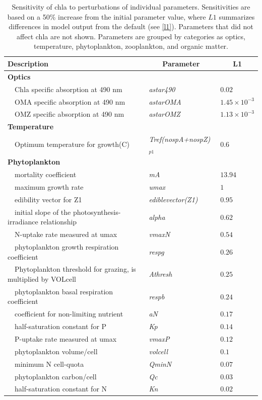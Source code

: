 \documentclass[letterpaper,12pt,oneside]{article}\usepackage[]{graphicx}\usepackage[]{color}
\begin{document}
\begin{table}[!tbp]
{\footnotesize
\caption{Sensitivity of \ac{chla} to perturbations of individual parameters.  Sensitivities are based on a 50\% increase from the initial parameter value, where $L1$ summarizes differences in model output from the default (see \cref{l1}).  Parameters that did not affect \ac{chla} are not shown.  Parameters are grouped by categories as optics, temperature, phytoplankton, zooplankton, and organic matter.\label{tab:chlsens}} 
\begin{center}
\begin{tabular}{lll}
\hline\hline
\multicolumn{1}{l}{Description}&\multicolumn{1}{c}{Parameter}&\multicolumn{1}{c}{L1}\tabularnewline
\hline
{\bfseries Optics}&&\tabularnewline
~~Chla specific absorption at 490 nm&\textit{astar490}&$0.02$\tabularnewline
~~OMA specific absorption at 490 nm&\textit{astarOMA}&$1.45\times 10^{-3}$\tabularnewline
~~OMZ specific absorption at 490 nm&\textit{astarOMZ}&$1.13\times 10^{-3}$\tabularnewline
\hline
{\bfseries Temperature}&&\tabularnewline
~~Optimum temperature for growth(C)&\textit{Tref(nospA+nospZ)$_{p1}$}&$0.6$\tabularnewline
\hline
{\bfseries Phytoplankton}&&\tabularnewline
~~mortality coefficient&\textit{mA}&$13.94$\tabularnewline
~~maximum growth rate&\textit{umax}&$1$\tabularnewline
~~edibility vector for Z1&\textit{ediblevector(Z1)}&$0.95$\tabularnewline
~~initial slope of the photosynthesis-irradiance relationship&\textit{alpha}&$0.62$\tabularnewline
~~N-uptake rate measured at umax&\textit{vmaxN}&$0.54$\tabularnewline
~~phytoplankton growth respiration coefficient&\textit{respg}&$0.26$\tabularnewline
~~Phytoplankton threshold for grazing, is multiplied by VOLcell&\textit{Athresh}&$0.25$\tabularnewline
~~phytoplankton basal respiration coefficient&\textit{respb}&$0.24$\tabularnewline
~~coefficient for non-limiting nutrient&\textit{aN}&$0.17$\tabularnewline
~~half-saturation constant for P&\textit{Kp}&$0.14$\tabularnewline
~~P-uptake rate measured at umax&\textit{vmaxP}&$0.12$\tabularnewline
~~phytoplankton volume/cell&\textit{volcell}&$0.1$\tabularnewline
~~minimum N cell-quota&\textit{QminN}&$0.07$\tabularnewline
~~phytoplankton carbon/cell&\textit{Qc}&$0.03$\tabularnewline
~~half-saturation constant for N&\textit{Kn}&$0.02$\tabularnewline

\end{tabular}
\end{center}}
\end{table}
\end{document}
